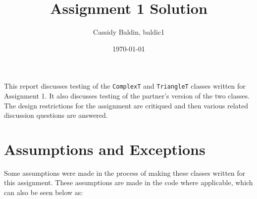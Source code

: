 \documentclass[12pt]{article}
\title{Assignment 1 Solution}
\author{Cassidy Baldin, baldic1}
\date{\today}
\begin{document}
\maketitle

This report discusses testing of the \verb|ComplexT| and \verb|TriangleT|
classes written for Assignment 1. It also discusses testing of the partner's
version of the two classes. The design restrictions for the assignment
are critiqued and then various related discussion questions are answered.

\section{Assumptions and Exceptions} \label{AssumptAndExcept}

Some assumptions were made in the process of making these classes written for 
this assignment. These assumptions are made in the code where applicable, which 
can also be seen below as:
\end{document}
